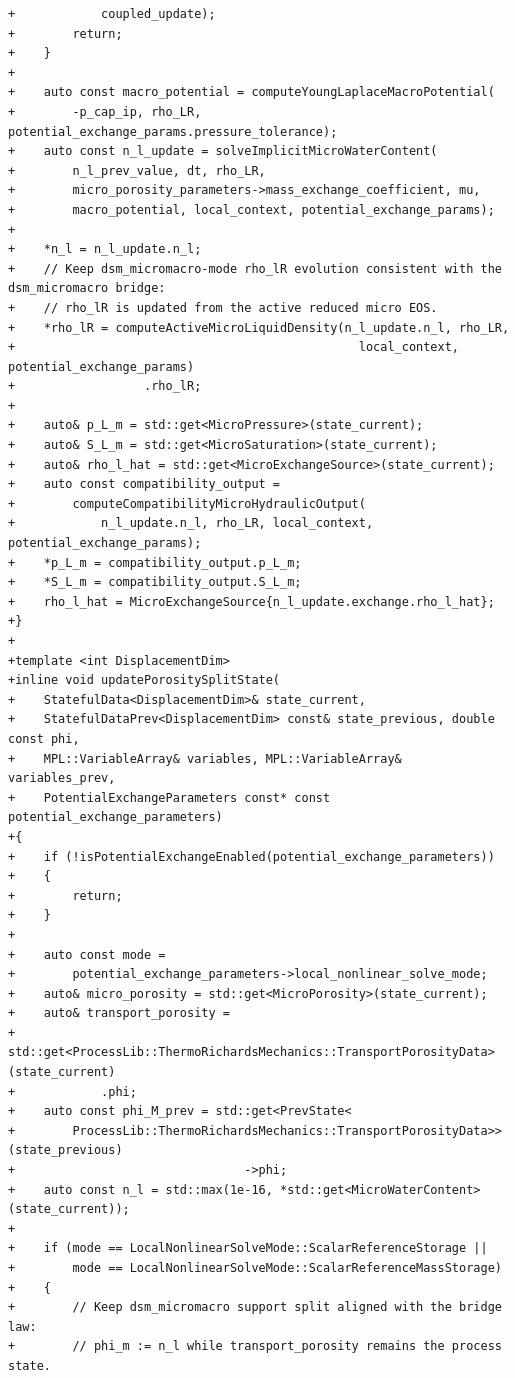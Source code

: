 \documentclass[10pt]{article}
\begin{document}
\begin{lstlisting}
+            coupled_update);
+        return;
+    }
+
+    auto const macro_potential = computeYoungLaplaceMacroPotential(
+        -p_cap_ip, rho_LR, potential_exchange_params.pressure_tolerance);
+    auto const n_l_update = solveImplicitMicroWaterContent(
+        n_l_prev_value, dt, rho_LR,
+        micro_porosity_parameters->mass_exchange_coefficient, mu,
+        macro_potential, local_context, potential_exchange_params);
+
+    *n_l = n_l_update.n_l;
+    // Keep dsm_micromacro-mode rho_lR evolution consistent with the dsm_micromacro bridge:
+    // rho_lR is updated from the active reduced micro EOS.
+    *rho_lR = computeActiveMicroLiquidDensity(n_l_update.n_l, rho_LR,
+                                                local_context, potential_exchange_params)
+                  .rho_lR;
+
+    auto& p_L_m = std::get<MicroPressure>(state_current);
+    auto& S_L_m = std::get<MicroSaturation>(state_current);
+    auto& rho_l_hat = std::get<MicroExchangeSource>(state_current);
+    auto const compatibility_output =
+        computeCompatibilityMicroHydraulicOutput(
+            n_l_update.n_l, rho_LR, local_context, potential_exchange_params);
+    *p_L_m = compatibility_output.p_L_m;
+    *S_L_m = compatibility_output.S_L_m;
+    rho_l_hat = MicroExchangeSource{n_l_update.exchange.rho_l_hat};
+}
+
+template <int DisplacementDim>
+inline void updatePorositySplitState(
+    StatefulData<DisplacementDim>& state_current,
+    StatefulDataPrev<DisplacementDim> const& state_previous, double const phi,
+    MPL::VariableArray& variables, MPL::VariableArray& variables_prev,
+    PotentialExchangeParameters const* const potential_exchange_parameters)
+{
+    if (!isPotentialExchangeEnabled(potential_exchange_parameters))
+    {
+        return;
+    }
+
+    auto const mode =
+        potential_exchange_parameters->local_nonlinear_solve_mode;
+    auto& micro_porosity = std::get<MicroPorosity>(state_current);
+    auto& transport_porosity =
+        std::get<ProcessLib::ThermoRichardsMechanics::TransportPorosityData>(state_current)
+            .phi;
+    auto const phi_M_prev = std::get<PrevState<
+        ProcessLib::ThermoRichardsMechanics::TransportPorosityData>>(state_previous)
+                                ->phi;
+    auto const n_l = std::max(1e-16, *std::get<MicroWaterContent>(state_current));
+
+    if (mode == LocalNonlinearSolveMode::ScalarReferenceStorage ||
+        mode == LocalNonlinearSolveMode::ScalarReferenceMassStorage)
+    {
+        // Keep dsm_micromacro support split aligned with the bridge law:
+        // phi_m := n_l while transport_porosity remains the process state.

\end{lstlisting}
\end{document}
